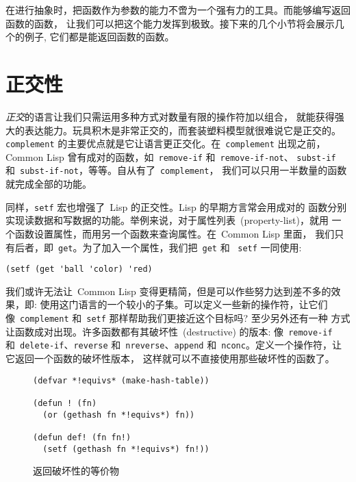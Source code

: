 在进行抽象时，把函数作为参数的能力不啻为一个强有力的工具。而能够编写返回函数的函数，
让我们可以把这个能力发挥到极致。接下来的几个小节将会展示几个\utility{}的例子,
它们都是能返回函数的函数。

\section{正交性}

\emph{正交}的语言让我们只需运用多种方式对数量有限的操作符加以组合，
就能获得强大的表达能力。玩具积木是非常正交的，而套装塑料模型就很难说它是正交的。
\texttt{complement} 的主要优点就是它让语言更正交化。在~\texttt{complement} 
出现之前，Common Lisp 曾有成对的函数，如~\texttt{remove-if} 和~\texttt{remove-if-not}、
\texttt{subst-if} 和~\texttt{subst-if-not}，等等。自从有了~\texttt{complement}，
我们可以只用一半数量的函数就完成全部的功能。

同样，\verb|setf| 宏也增强了~Lisp 的正交性。Lisp 的早期方言常会用成对的
函数分别实现读数据和写数据的功能。举例来说，对于属性列表~(property-list)，就用
一个函数设置属性，而用另一个函数来查询属性。在~Common Lisp 里面，
我们只有后者，即~\texttt{get}。为了加入一个属性，我们把~\texttt{get} 和
~\texttt{setf} 一同使用:
\begin{lstlisting}
(setf (get 'ball 'color) 'red)
\end{lstlisting}

我们或许无法让~Common Lisp 变得更精简，但是可以作些努力达到差不多的效果，即: 
使用这门语言的一个较小的子集。可以定义一些新的操作符，让它们像~\verb|complement| 
和~\verb|setf| 那样帮助我们更接近这个目标吗? 至少另外还有一种
方式让函数成对出现。许多函数都有其破坏性~(destructive) 的版本: 像~\verb|remove-if|  
和~\verb|delete-if|、\verb|reverse| 和~\verb|nreverse|、\verb|append| 
和~\verb|nconc|。定义一个操作符，让它返回一个函数的破坏性版本，
这样就可以不直接使用那些破坏性的函数了。

\begin{figure}
\begin{lstlisting}
(defvar *!equivs* (make-hash-table))

(defun ! (fn)
  (or (gethash fn *!equivs*) fn))

(defun def! (fn fn!)
  (setf (gethash fn *!equivs*) fn!))
\end{lstlisting}
\caption{\label{fig:returning-destructive-equivalents}返回破坏性的等价物}
\end{figure}

